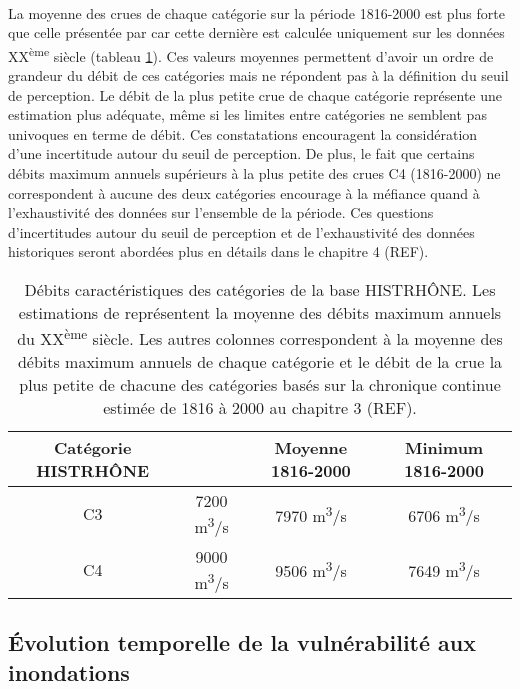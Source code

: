 \documentclass[11pt]{article}
\begin{document}
	\paragraph{} La moyenne des crues de chaque catégorie sur la période 1816-2000 est plus forte que celle présentée par \citet{pichard_hydro-climatology_2017} car cette dernière est calculée uniquement sur les données XX\textsuperscript{ème} siècle (tableau \ref{tab:Qcateg}). Ces valeurs moyennes permettent d'avoir un ordre de grandeur du débit de ces catégories mais ne répondent pas à la définition du seuil de perception. Le débit de la plus petite crue de chaque catégorie représente une estimation plus adéquate, même si les limites entre catégories ne semblent pas univoques en terme de débit. Ces constatations encouragent la considération d'une incertitude autour du seuil de perception. De plus, le fait que certains débits maximum annuels supérieurs à la plus petite des crues C4 (1816-2000) ne correspondent à aucune des deux catégories encourage à la méfiance quand à l'exhaustivité des données sur l'ensemble de la période. Ces questions d'incertitudes autour du seuil de perception et de l'exhaustivité des données historiques seront abordées plus en détails dans le chapitre 4 (REF).

	\begin{table}[h]
	\centering
	\caption{Débits caractéristiques des catégories de la base HISTRHÔNE. Les estimations de \citet{pichard_hydro-climatology_2017} représentent la moyenne des débits maximum annuels du XX\textsuperscript{ème} siècle. Les autres colonnes correspondent à la moyenne des débits maximum annuels de chaque catégorie et le débit de la crue la plus petite de chacune des catégories basés sur la chronique continue estimée de 1816 à 2000 au chapitre 3 (REF).} 
	\label{tab:Qcateg}
		\begin{tabular}{|c|c|c|c|}
		\hline
		Catégorie HISTRHÔNE & \citet{pichard_hydro-climatology_2017} & Moyenne 1816-2000 & Minimum 1816-2000\\ \hline
		C3  & 7200 m\textsuperscript{3}/s  & 7970 m\textsuperscript{3}/s    & 6706 m\textsuperscript{3}/s   \\ \hline
		C4  & 9000 m\textsuperscript{3}/s  & 9506 m\textsuperscript{3}/s    & 7649 m\textsuperscript{3}/s   \\ \hline
		\end{tabular}
	\end{table}
	
	\subsection{Évolution temporelle de la vulnérabilité aux inondations}
	\label{subsec:EvolVuln}
	
\end{document}
